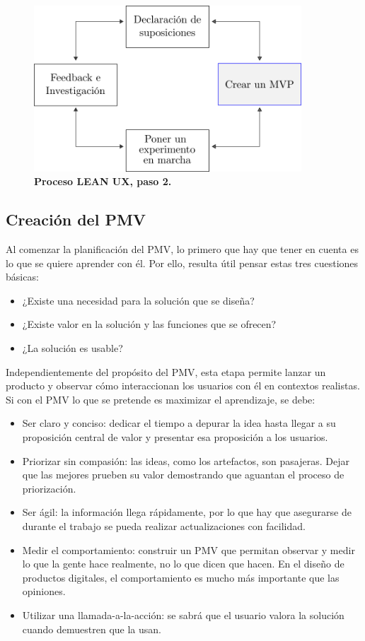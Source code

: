 \begin{figure}[h]
\includegraphics[width=10cm]{Img/Desarrollo/desarrollo2.png}
\centering
\caption{\textbf{ \footnotesize{Proceso LEAN UX, paso 2. }}}
\end{figure}
\label{fig:leanux2}

\subsection{Creación del PMV}
Al comenzar la planificación del PMV, lo primero que hay que tener en cuenta es lo que se quiere aprender con él. Por ello, resulta útil pensar estas tres cuestiones básicas: 
\begin{itemize}
    \item ¿Existe una necesidad para la solución que se diseña? 
    \item ¿Existe valor en la solución y las funciones que se ofrecen?
    \item  ¿La solución es usable?
\end{itemize}

Independientemente del propósito del PMV, esta etapa permite lanzar un producto y observar cómo interaccionan los usuarios con él en contextos realistas. Si con el PMV lo que se pretende es maximizar el aprendizaje, se debe:
\begin{itemize}
    \item Ser claro y conciso: dedicar el tiempo a depurar la idea hasta llegar a su proposición central de valor y presentar esa proposición a los usuarios. 
    \item Priorizar sin compasión: las ideas, como los artefactos, son pasajeras. Dejar que las mejores prueben su valor demostrando que aguantan el proceso de priorización. 
    \item Ser ágil: la información llega rápidamente, por lo que hay que asegurarse de durante el trabajo se pueda realizar actualizaciones con facilidad. 
    \item Medir el comportamiento: construir un PMV que permitan observar y medir lo que la gente hace realmente, no lo que dicen que hacen. En el diseño de productos digitales, el comportamiento es mucho más importante que las opiniones. 
    \item Utilizar una llamada-a-la-acción: se sabrá que el usuario valora la solución cuando demuestren que la usan.
\end{itemize}

